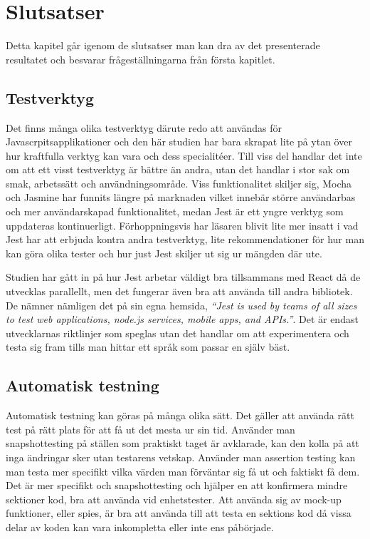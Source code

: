 \section{Slutsatser}
\label{sec:david-conclusion}
Detta kapitel går igenom de slutsatser man kan dra av det presenterade resultatet och besvarar frågeställningarna från första kapitlet.
\subsection{Testverktyg}
Det finns många olika testverktyg därute redo att användas för Javascrpitsapplikationer och den här studien har bara skrapat lite på ytan över hur kraftfulla verktyg kan vara och dess specialitéer. Till viss del handlar det inte om att ett visst testverktyg är bättre än andra, utan det handlar i stor sak om smak, arbetssätt och användningsområde. Viss funktionalitet skiljer sig, Mocha och Jasmine har funnits längre på marknaden vilket innebär större användarbas och mer användarskapad funktionalitet, medan Jest är ett yngre verktyg som uppdateras kontinuerligt. Förhoppningsvis har läsaren blivit lite mer insatt i vad Jest har att erbjuda kontra andra testverktyg, lite rekommendationer för hur man kan göra olika tester och hur just Jest skiljer ut sig ur mängden där ute. 

Studien har gått in på hur Jest arbetar väldigt bra tillsammans med React då de utvecklas parallellt, men det fungerar även bra att använda till andra bibliotek. De nämner nämligen det på sin egna hemsida, \textit{``Jest is used by teams of all sizes to test web applications, node.js services, mobile apps, and APIs.''}\cite{bib-jest}.  Det är endast utvecklarnas riktlinjer som speglas utan det handlar om att experimentera och testa sig fram tills man hittar ett språk som passar en själv bäst. 

\subsection{Automatisk testning}
Automatisk testning kan göras på många olika sätt. Det gäller att använda rätt test på rätt plats för att få ut det mesta ur sin tid. Använder man snapshottesting på ställen som praktiskt taget är avklarade, kan den kolla på att inga ändringar sker utan testarens vetskap. Använder man assertion testing kan man testa mer specifikt vilka värden man förväntar sig få ut och faktiskt få dem. Det är mer specifikt och snapshottesting och hjälper en att konfirmera mindre sektioner kod, bra att använda vid enhetstester. Att använda sig av mock-up funktioner, eller spies, är bra att använda till att testa en sektions kod då vissa delar av koden kan vara inkompletta eller inte ens påbörjade. 